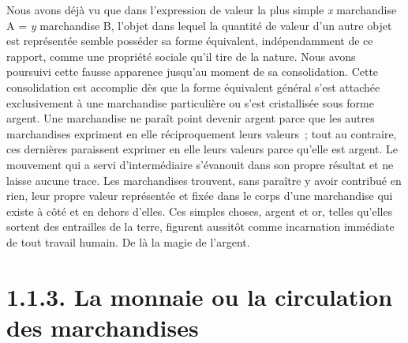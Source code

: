 \documentclass[french,twoside]{book} %
\begin{document}
Nous avons déjà vu que dans l’expression de valeur la plus simple \emph{x} marchandise A = \emph{y} marchandise B, l’objet dans lequel la quantité de valeur d’un autre objet est représentée semble posséder sa forme équivalent, indépendamment de ce rapport, comme une propriété sociale qu’il tire de la nature. Nous avons poursuivi cette fausse apparence jusqu’au moment de sa consolidation. Cette consolidation est accomplie dès que la forme équivalent général s’est attachée exclusivement à une marchandise particulière ou s’est cristallisée sous forme argent. Une marchandise ne paraît point devenir argent parce que les autres marchandises expriment en elle réciproquement leurs valeurs ; tout au contraire, ces dernières paraissent exprimer en elle leurs valeurs parce qu’elle est argent. Le mouvement qui a servi d’intermédiaire s’évanouit dans son propre résultat et ne laisse aucune trace. Les marchandises trouvent, sans paraître y avoir contribué en rien, leur propre valeur représentée et fixée dans le corps d’une marchandise qui existe à côté et en dehors d’elles. Ces simples choses, argent et or, telles qu’elles sortent des entrailles de la terre, figurent aussitôt comme incarnation immédiate de tout travail humain. De là la magie de l’argent.
\section[{1.1.3. La monnaie ou la circulation des marchandises}]{1.1.3. La monnaie ou la circulation des marchandises}\renewcommand{\leftmark}{1.1.3. La monnaie ou la circulation des marchandises}
\end{document}
